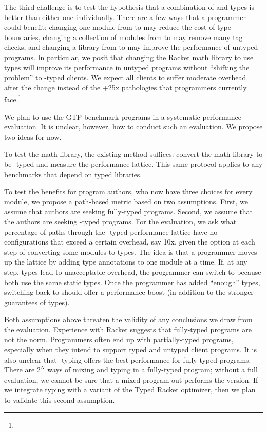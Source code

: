 The third challenge is to test the hypothesis that a combination of \tdeep{}
 and \tshallow{} types is better than either one individually.
There are a few ways that a programmer could benefit:
 changing one module from \tdeep{} to \tshallow{} may reduce the cost of type boundaries,
 changing a collection of modules from \tshallow{} to \tdeep{} may remove many tag checks,
 and changing a library from \tdeep{} to \tshallow{} may improve the performance of untyped programs.
In particular, we posit that changing the Racket math library to use \tshallow{}
types will improve its performance in untyped programs without ``shifting the problem''
to \tdeep{}-typed clients.
We expect all clients to suffer moderate overhead after the change instead
of the +25x pathologies that programmers currently face.\footnote{}

We plan to use the GTP benchmark programs in a systematic performance evaluation.
It is unclear, however, how to conduct such an evaluation.
We propose two ideas for now.

To test the math library, the existing method suffices:
 convert the math library to be \tshallow{}-typed and measure the performance lattice.
This same protocol applies to any benchmarks that depend on typed libraries.

To test the benefits for program authors, who now have three choices for every
module, we propose a path-based metric based on two assumptions.
First, we assume that authors are seeking fully-typed programs.
Second, we assume that the authors are seeking \tdeep{}-typed programs.
For the evaluation, we ask what percentage of paths through the \tdeep{}-typed performance
 lattice have no configurations that exceed a certain overhead, say 10x, given
 the option at each step of converting some modules to \tshallow{} types.
The idea is that a programmer moves up the lattice by adding type annotations
 to one module at a time.
If, at any step, \tdeep{} types lead to unacceptable overhead, the programmer can
 switch to \tshallow{} because both use the same static types.
Once the programmer has added ``enough'' types, switching back to \tdeep{} should
offer a performance boost (in addition to the stronger guarantees of \tdeep{} types).

Both assumptions above threaten the validity of any conclusions we draw from the
evaluation.
Experience with Racket suggests that fully-typed programs are not the norm.
Programmers often end up with partially-typed programs, especially when they
intend to support typed and untyped client programs.
It is also unclear that \tdeep{}-typing offers the best performance for fully-typed
programs.
There are $2^N$ ways of mixing \tdeep{} and \tshallow{} typing in a fully-typed program;
 without a full evaluation, we cannot be sure that a mixed program out-performs
 the \tdeep{} version.
If we integrate \tshallow{} typing with a variant of the Typed Racket optimizer,
then we plan to validate this second assumption.

